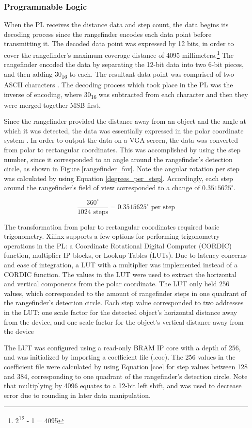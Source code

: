 \subsubsection{Programmable Logic}
When the PL receives the distance data and step count, the data begins its decoding process since the rangefinder encodes each data point before transmitting it. The decoded data point was expressed by 12 bits, in order to cover the rangefinder's maximum coverage distance of 4095 millimeters.\footnote{ 2\textsuperscript{12} - 1 = 4095} The rangefinder encoded the data by separating the 12-bit data into two 6-bit pieces, and then adding 30\textsubscript{16} to each. The resultant data point was comprised of two ASCII characters \cite{ascii}. The decoding process which took place in the PL was the inverse of encoding, where 30\textsubscript{16} was subtracted from each character and then they were merged together MSB first\cite{urg04lx_datasheet}.
\par
Since the rangefinder provided the distance away from an object and the angle at which it was detected, the data was essentially expressed in the polar coordinate system \cite{polar_coordinates}. In order to output the data on a VGA screen, the data was converted from polar to rectangular coordinates. This was accomplished by using the step number, since it corresponded to an angle around the rangefinder's detection circle, as shown in Figure \ref{rangefinder_fov}. Note the angular rotation per step was calculated by using Equation \ref{degrees_per_step}. Accordingly, each step around the rangefinder's field of view corresponded to a change of $0.3515625^\circ$.
\par
\begin{equation}
	\dfrac{360^\circ }{1024 \textrm{ steps}}  = 0.3515625^\circ \textrm{ per step}
	\label{degrees_per_step}
\end{equation}
\par
The transformation from polar to rectangular coordinates required basic trigonometry. Xilinx supports a few options for performing trigonometry operations in the PL: a Coordinate Rotational Digital Computer (CORDIC) function, multiplier IP blocks, or Lookup Tables (LUTs). Due to latency concerns and ease of integration, a LUT with a multiplier was implemented instead of a CORDIC function. The values in the LUT were used to extract the horizontal and vertical components from the polar coordinate. The LUT only held 256 values, which corresponded to the amount of rangefinder steps in one quadrant of the rangefinder's detection circle. Each step value corresponded to two addresses in the LUT: one scale factor for the detected object's horizontal distance away from the device, and one scale factor for the object's vertical distance away from the device
\par
The LUT was configured using a read-only BRAM IP core with a depth of 256, and was initialized by importing a coefficient file (.coe). The 256 values in the coefficient file were calculated by using Equation \ref{coe} for step values between 128 and 384, corresponding to one quadrant of the rangefinder's detection circle. Note that multiplying by 4096 equates to a 12-bit left shift, and was used to decrease error due to rounding in later data manipulation.

